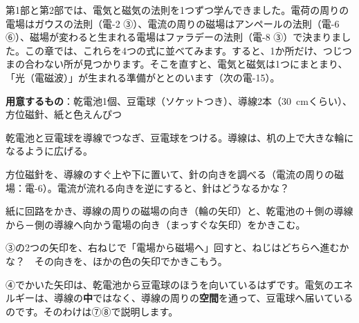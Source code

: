 \noindent 第1部と第2部では、電気と磁気の法則を1つずつ学んできました。電荷の周りの電場はガウスの法則（電-2 ③）、電流の周りの磁場はアンペールの法則（電-6 ⑥）、磁場が変わると生まれる電場はファラデーの法則（電-8 ③）で決まりました。この章では、これらを4つの式に並べてみます。すると、1か所だけ、つじつまの合わない所が見つかります。そこを直すと、電気と磁気は1つにまとまり、「光（電磁波）」が生まれる準備がととのいます（次の電-15）。

\begin{yattemiyou}
\textbf{用意するもの}：乾電池1個、豆電球（ソケットつき）、導線2本（\qty{30}{cm}くらい）、方位磁針、紙と色えんぴつ
\begin{enumerate}[label={\bkcircled[bkGreen]{\arabic*}}, leftmargin=2.4\zw, itemsep=1pt, topsep=2pt]
\item 乾電池と豆電球を導線でつなぎ、豆電球をつける。導線は、机の上で大きな輪になるように広げる。
\item 方位磁針を、導線のすぐ上や下に置いて、針の向きを調べる（電流の周りの磁場：電-6）。電流が流れる向きを逆にすると、針はどうなるかな？
\item 紙に回路をかき、導線の周りの磁場の向き（輪の矢印）と、乾電池の＋側の導線から－側の導線へ向かう電場の向き（まっすぐな矢印）をかきこむ。
\item ③の2つの矢印を、右ねじで「電場から磁場へ」回すと、ねじはどちらへ進むかな？　その向きを、ほかの色の矢印でかきこもう。
\end{enumerate}
\end{yattemiyou}

\noindent ④でかいた矢印は、乾電池から豆電球のほうを向いているはずです。電気のエネルギーは、導線の\textbf{中}ではなく、導線の周りの\textbf{空間}を通って、豆電球へ届いているのです。そのわけは⑦⑧で説明します。

\begin{omoidasou}
\end{omoidasou}


